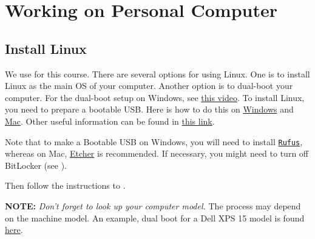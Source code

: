 \documentclass[hidelinks]{article}
\begin{document}
\section*{Working on Personal Computer}

\subsection{Install Linux}
We use \href{http://releases.ubuntu.com/jammy/}{\color{blue}{Ubuntu 22.04}} for this course. There are several options for using Linux. One is to install Linux as the main OS of your computer. Another option is to dual-boot your computer. For the dual-boot setup on Windows, see \href{https://youtube.com/watch?v=OU\_dkeFprhY\&feature=share}{\color{blue}this video}. To install Linux, you need to prepare a bootable USB. Here is how to do this on \href{https://ubuntu.com/tutorials/create-a-usb-stick-on-windows}{\color{blue}Windows} and \href{https://ubuntu.com/tutorials/create-a-usb-stick-on-macos}{\color{blue}Mac}.
Other useful information can be found in \href{https://phoenixnap.com/kb/ubuntu-22-04-lts}{\color{blue}this link}.

\vspace{0.1in}

Note that to make a Bootable USB on Windows, you will need to install \href{https://rufus.ie/en/}{\color{blue}\texttt{Rufus}}, whereas on Mac, \href{https://etcher.balena.io/}{\color{blue}Etcher} is recommended.
If necessary, you might need to turn off BitLocker (see \href{https://answers.microsoft.com/en-us/windows/forum/all/no-option-to-turn-off-bitlocker-in-windows-10-home/a929de9f-f73e-46bc-854d-a5b1bd332c04}{\color{blue}{here}}).

\vspace{0.1in}

Then follow the instructions to \href{https://www.ubuntu.com/download/desktop/install-ubuntu-desktop}{\color{blue}{install Ubuntu}}. 

\vspace{0.1in}

\textbf{NOTE:} \emph{Don't forget to look up your computer model.} The process may depend on the machine model.
An example, dual boot for a Dell XPS 15 model is found \href{https://gist.github.com/estherjk/86381ab10c0bb3a1a9046f7f64b6d1df}{\color{blue} here}.
\end{document}
